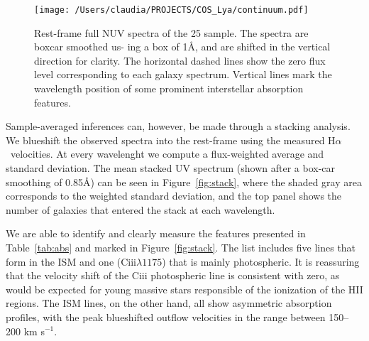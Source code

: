 \documentclass[manuscript]{emulateapj}
\newcommand{\ha}{H$\alpha$}
\begin{document}
\begin{figure}[h!]
   \centering
  \texttt{[image: /Users/claudia/PROJECTS/COS\_Lya/continuum.pdf]}
   \caption{Rest-frame full NUV spectra of the 25 sample. The spectra are boxcar smoothed us-
ing a box of 1\AA, and are shifted in the vertical direction
for clarity. The horizontal dashed lines show the zero flux level corresponding
to each galaxy spectrum. Vertical lines mark the wavelength position
of some prominent interstellar absorption features.}
  \label{fig:spectra_full}
\end{figure}

Sample-averaged inferences can, however, be made through a stacking
analysis. We blueshift the observed spectra into the rest-frame using
the measured \ha\ velocities. At every wavelenght we compute a
flux-weighted average and standard deviation. The mean stacked UV
spectrum (shown after a box-car smoothing of 0.85\AA) can be seen in
Figure~\ref{fig:stack}, where the shaded gray area corresponds to the
weighted standard deviation, and the top panel shows the number of
galaxies that entered the stack at each wavelength.

We are able to identify and clearly measure the features presented in
Table~\ref{tab:abs} and marked in Figure~\ref{fig:stack}. The list
includes five lines that form in the ISM and one (C{\sc iii}$\lambda
1175$) that is mainly photospheric. It is reassuring that the velocity
shift of the C{\sc iii} photospheric line is consistent with zero, as
would be expected for young massive stars responsible of the
ionization of the HII regions. The ISM lines, on the other hand, all
show asymmetric absorption profiles, with the peak  blueshifted outflow velocities in the range between 150--200 km
s$^{-1}$. 

\end{document}
